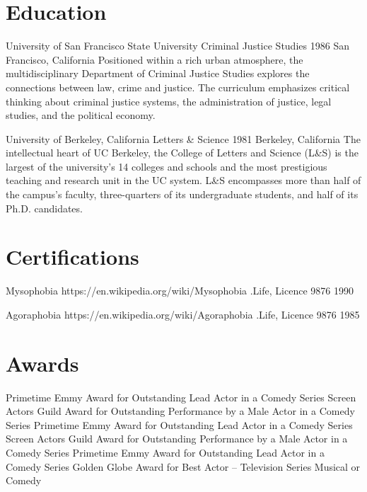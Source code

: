 \documentclass[]{mcec-cv-01}
\begin{document}
\section{Education}
\nopagebreak
\begin{mcecllist}

\litem
{University of San Francisco State University}
{Criminal Justice Studies}
{1986}
{San Francisco, California}
{Positioned within a rich urban atmosphere, the multidisciplinary Department of Criminal Justice Studies explores the connections between law, crime and justice. The curriculum emphasizes critical thinking about criminal justice systems, the administration of justice, legal studies, and the political economy.}

\litem
{University of Berkeley, California}
{Letters \& Science}
{1981}
{Berkeley, California}
{The intellectual heart of UC Berkeley, the College of Letters and Science (L\&S) is the largest of the university's 14 colleges and schools and the most prestigious teaching and research unit in the UC system. L\&S encompasses more than half of the campus's faculty, three-quarters of its undergraduate students, and half of its Ph.D. candidates.}

\end{mcecllist}

\section{Certifications}
\nopagebreak
\begin{mcecnlist}

\nitem
{Mysophobia}
{https://en.wikipedia.org/wiki/Mysophobia}
{.Life, Licence 9876}
{1990}

\nitem
{Agoraphobia}
{https://en.wikipedia.org/wiki/Agoraphobia}
{.Life, Licence 9876}
{1985}
    
\end{mcecnlist}

\section{Awards}
\nopagebreak
\begin{mcecslist}

 {Primetime Emmy Award for Outstanding Lead Actor in a Comedy Series}
 {Screen Actors Guild Award for Outstanding Performance by a Male Actor in a Comedy Series}
 {Primetime Emmy Award for Outstanding Lead Actor in a Comedy Series}
 {Screen Actors Guild Award for Outstanding Performance by a Male Actor in a Comedy Series}
 {Primetime Emmy Award for Outstanding Lead Actor in a Comedy Series}
 {Golden Globe Award for Best Actor – Television Series Musical or Comedy}

\end{mcecslist}
\end{document}
